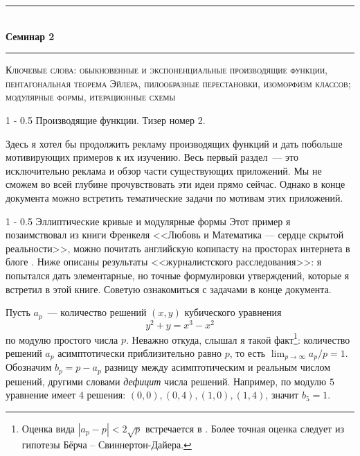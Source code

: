 \documentclass{article}
\makeatletter
\def \topic {Семинар 2}
\theoremstyle{definition}
\renewcommand{\section}{\@startsection
{section}%
{1}%
{\z@}%
{-\baselineskip}%
{0.5\baselineskip}%
{\centering\large\scshape}} %
\renewcommand{\subsection}{\@startsection
{subsection}%
{1}%
{\z@}%
{-\baselineskip}%
{0.5\baselineskip}%
{\centering\large\scshape}} %
\makeatother
\begin{document}
\begin{center}

\newcommand{\HRule}{\rule{\linewidth}{0.5mm}}
\HRule \\[0.2cm]
{ \Large \bfseries \topic} %
\HRule

\end{center}

\textsc{Ключевые слова: обыкновенные и экспоненциальные производящие функции, пентагональная теорема Эйлера, пилообразные перестановки, изоморфизм классов; модулярные формы, итерационные схемы}

\section{Производящие функции. Тизер номер 2.}

Здесь я хотел бы продолжить рекламу производящих функций и дать побольше 
мотивирующих примеров к их изучению. Весь первый раздел~--- это исключительно
реклама и обзор части существующих приложений. Мы не сможем во всей глубине
прочувствовать эти идеи прямо сейчас. Однако в конце документа можно встретить
тематические задачи по мотивам этих приложений.

\subsection{Эллиптические кривые и модулярные формы}
Этот пример я позаимствовал из книги Френкеля <<Любовь и Математика --- сердце
скрытой реальности>>, можно почитать английскую копипасту на просторах интернета
в блоге \cite{shimura-taniyama}. Ниже описаны результаты <<журналистского
расследования>>: я попытался дать элементарные, но точные формулировки
утверждений, которые я встретил в этой книге. Советую ознакомиться с задачами в
конце документа.

Пусть \( a_p \)~--- количество решений \( (x, y) \) кубического уравнения
\[
	y^2 + y = x^3 - x^2
\]
по модулю простого числа \( p \). Неважно откуда, слышал я такой факт\footnote{Оценка вида \( |a_p - p| < 2 \sqrt p \) встречается в \cite[Theorem 477]{number_theory}. Более точная оценка следует из гипотезы Бёрча -- Свиннертон-Дайера.}: количество решений \( a_p \) асимптотически приблизительно равно \( p \), то есть \( \lim_{p \to \infty} a_p / p = 1 \). Обозначим \( b_p = p - a_p \) разницу между асимптотическим и реальным числом решений, другими словами \textit{дефицит} числа решений. Например, по модулю \( 5 \) уравнение имеет \( 4 \) решения: \( (0,0 ), (0, 4), (1,0), (1,4) \), значит \( b_5 = 1 \).
\end{document}
